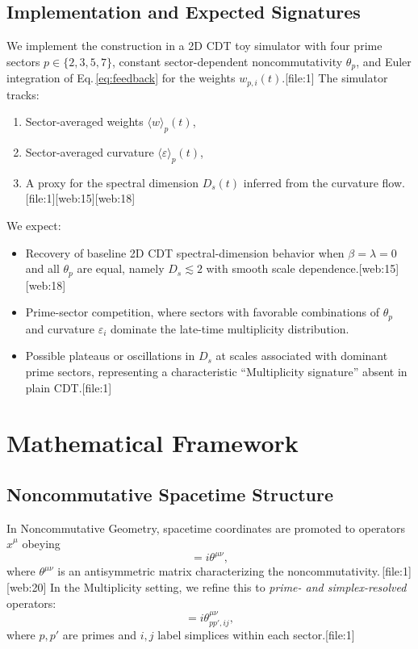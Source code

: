\documentclass[11pt]{article}
\begin{document}
\subsection{Implementation and Expected Signatures}

We implement the construction in a 2D CDT toy simulator with four prime
sectors \(p \in \{2,3,5,7\}\), constant sector-dependent noncommutativity
\(\theta_p\), and Euler integration of Eq.\,\eqref{eq:feedback} for the
weights \(w_{p,i}(t)\).[file:1] The simulator tracks:
\begin{enumerate}[label=(\roman*)]
  \item Sector-averaged weights \(\langle w \rangle_p(t)\),
  \item Sector-averaged curvature \(\langle \varepsilon \rangle_p(t)\),
  \item A proxy for the spectral dimension \(D_s(t)\) inferred from the
        curvature flow.[file:1][web:15][web:18]
\end{enumerate}
We expect:
\begin{itemize}
  \item Recovery of baseline 2D CDT spectral-dimension behavior when
        \(\beta = \lambda = 0\) and all \(\theta_p\) are equal, namely
        \(D_s \lesssim 2\) with smooth scale dependence.[web:15][web:18]
  \item Prime-sector competition, where sectors with favorable combinations
        of \(\theta_p\) and curvature \(\varepsilon_i\) dominate the late-time
        multiplicity distribution.
  \item Possible plateaus or oscillations in \(D_s\) at scales associated
        with dominant prime sectors, representing a characteristic
        ``Multiplicity signature'' absent in plain CDT.[file:1]
\end{itemize}

\section{Mathematical Framework}

\subsection{Noncommutative Spacetime Structure}

In Noncommutative Geometry, spacetime coordinates are promoted to
operators \(\hat{x}^\mu\) obeying
\begin{equation}
  [\hat{x}^\mu, \hat{x}^\nu]
    = i \theta^{\mu\nu},
\end{equation}
where \(\theta^{\mu\nu}\) is an antisymmetric matrix characterizing the
noncommutativity.\,[file:1][web:20] In the Multiplicity setting, we refine this
to \emph{prime- and simplex-resolved} operators:
\begin{equation}
  [\hat{x}^\mu_{p,i}, \hat{x}^\nu_{p',j}]
    = i \theta^{\mu\nu}_{pp',ij},
\end{equation}
where \(p,p'\) are primes and \(i,j\) label simplices within each
sector.[file:1]
\end{document}
